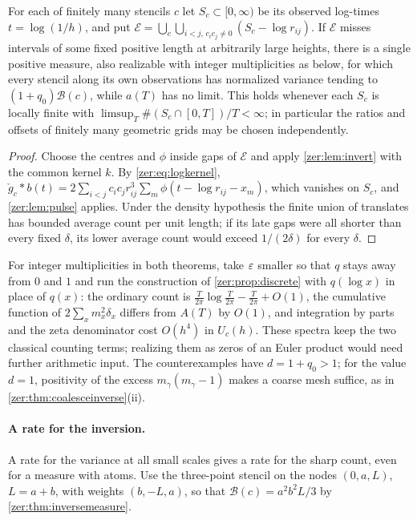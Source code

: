 \begin{theorem}\label{zer:thm:bankmesh}
For each of finitely many stencils $c$ let $S_c\subset[0,\infty)$ be its observed log-times $t=\log(1/h)$, and
put $\mathcal E=\bigcup_c\bigcup_{i<j,\,c_ic_j\ne0}(S_c-\log r_{ij})$. If $\mathcal E$ misses intervals of some fixed
positive length at arbitrarily large heights, there is a single positive measure, also realizable with integer
multiplicities as below, for which every stencil along its own observations has normalized variance tending to
$(1+q_0)\mathcal B(c)$, while $a(T)$ has no limit. This holds whenever each $S_c$ is locally finite with
$\limsup_T\#(S_c\cap[0,T])/T<\infty$; in particular the ratios and offsets of finitely many geometric grids may
be chosen independently.
\end{theorem}
\begin{proof}
Choose the centres and $\phi$ inside gaps of $\mathcal E$ and apply \cref{zer:lem:invert} with the common kernel
$k$. By \eqref{zer:eq:logkernel}, $\check g_c*b(t)=2\sum_{i<j}c_ic_jr_{ij}^3\sum_m\phi(t-\log r_{ij}-x_m)$, which
vanishes on $S_c$, and \cref{zer:lem:pulse} applies. Under the density hypothesis the finite union of
translates has bounded average count per unit length; if its late gaps were all shorter than every fixed
$\delta$, its lower average count would exceed $1/(2\delta)$ for every $\delta$.
\end{proof}

For integer multiplicities in both theorems, take $\varepsilon$ smaller so that $q$ stays away from $0$ and $1$ and run
the construction of \cref{zer:prop:discrete} with $q(\log x)$ in place of $q(x)$: the ordinary count is
$\frac T{2\pi}\log\frac T{2\pi}-\frac T{2\pi}+O(1)$, the cumulative function of $2\sum_xm_x^2\delta_x$ differs from
$A(T)$ by $O(1)$, and integration by parts and the zeta denominator cost $O(h^4)$ in $U_c(h)$. These spectra
keep the two classical counting terms; realizing them as zeros of an Euler product would need further
arithmetic input. The counterexamples have $d=1+q_0>1$; for the value $d=1$, positivity of the excess
$m_\gamma(m_\gamma-1)$ makes a coarse mesh suffice, as in \cref{zer:thm:coalesceinverse}(ii).

\paragraph{A rate for the inversion.}
A rate for the variance at all small scales gives a rate for the sharp count, even for a measure with atoms.
Use the three-point stencil on the nodes $(0,a,L)$, $L=a+b$, with weights $(b,-L,a)$, so that
$\mathcal B(c)=a^2b^2L/3$ by \cref{zer:thm:inversemeasure}.


